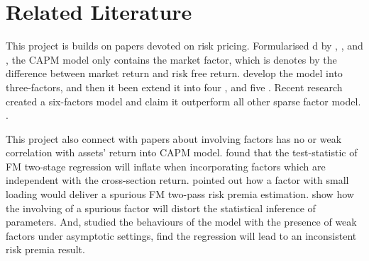 













	\section{Related Literature}

This project is builds on papers devoted on  risk pricing.
Formularised d by , , and , the CAPM model only contains the market factor, which is denotes by the difference between market return and risk free return.
 develop the model into three-factors, and then it been extend it into four \cite{Carhart1997}, and five \cite{Fama2015}.
Recent research created a six-factors model and claim it outperform all other sparse factor model. \cite{Kelly2019}.

This project also connect with papers about involving factors has no or weak correlation with assets' return into CAPM model.
 found that the test-statistic of FM two-stage regression  \cite{Fama1973} will inflate when incorporating factors which are independent with the cross-section return.
 pointed out how a factor with small loading would deliver a spurious FM two-pass risk premia estimation. 
 show how the involving of a spurious factor will distort the statistical inference of parameters.
And,  studied the behaviours of the model with the presence of weak factors under asymptotic settings, find the regression will lead to an inconsistent risk premia result.
	
